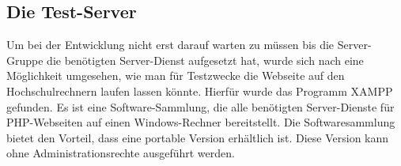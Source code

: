 \subsection{Die Test-Server}
Um bei der Entwicklung nicht erst darauf warten zu müssen bis die Server-Gruppe die benötigten Server-Dienst aufgesetzt hat, wurde sich nach eine Möglichkeit umgesehen, wie man für Testzwecke die Webseite auf den Hochschulrechnern laufen lassen könnte. Hierfür wurde das Programm XAMPP gefunden. Es ist eine Software-Sammlung, die alle benötigten Server-Dienste für PHP-Webseiten auf einen Windows-Rechner bereitstellt. Die Softwaresammlung bietet den Vorteil, dass eine portable Version erhältlich ist. Diese Version kann ohne Administrationsrechte ausgeführt werden.